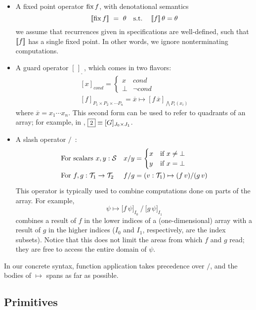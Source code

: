 \begin{itemize}
  \item A fixed point operator $\operatorname{fix} f$, with denotational semantics
    \[[\![{\operatorname{fix} f}]\!] ~=~ \theta \textrm{ ~ s.t. ~ } [\![{f}]\!]\,\theta=\theta\]
  we assume that recurrences given in specifications are well-defined, 
  such that $[\![{f}]\!]$ has a single fixed point.
  In other words, we ignore nonterminating computations.
  \item A guard operator $[\,]_{_\square}\,$, which comes in two flavors:
  \[\begin{array}{l}
      [x]_{\mathit{cond}} = \begin{cases}x & \mathit{cond} \\ \bot & \lnot\mathit{cond}\end{cases} \\
      {}[f]_{P_1\times P_2\times \cdots P_n} = \overline{x} \mapsto [f\,\overline{x}]_{\bigwedge P_i(x_i)}
    \end{array}\]
  where $\overline{x} = x_1 \cdots x_n$. This second form can be used to
  refer to quadrants of an array; for example, in , $\qbox2 \equiv [G]_{J_0\times J_1}$.
  \item A slash operator $/$~:     \vspace{-2pt}
  \[\renewcommand\arraystretch{1.5}
    \begin{array}{ll}
      \mbox{For scalars $x,y:\S$} & x/y = \begin{cases}x & \mbox{if }x\neq\bot \\ y & \mbox{if }x=\bot\end{cases} \\
      \mbox{For $f,g:\T_1\to\T_2$} & f/g = (v:\T_1)\mapsto (f\,v)/(g\,v)
    \end{array}\]
  This operator is typically used to combine computations done on
  parts of the array. For example, \[\psi\mapsto \big[f\,\psi\big]_{I_0} ~ \Big/ ~ \big[g\,\psi\big]_{I_1}\]
  combines a result of $f$ in the lower indices of a (one-dimensional) array
  with a result of $g$ in the higher indices ($I_0$ and $I_1$, respectively, are the index subsets).
  Notice that this does not limit the areas from which $f$ and $g$ read;
  they are free to access the entire domain of $\psi$.
\end{itemize}

In our concrete syntax, function application takes precedence over $/$,
and the bodies of $\mapsto$ spans as far as possible.

\subsection{Primitives}

